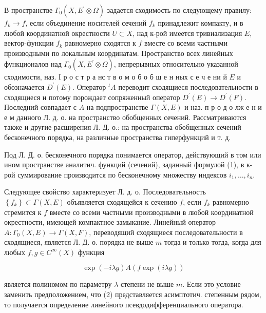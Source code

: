 \documentclass[10pt]{article}
\begin{document}
В пространстве $\Gamma_{0}\left(X, E^{\prime} \otimes \Omega\right)$ задается сходимость по следующему правилу: $f_{k} \rightarrow f$, если объединение носителей сечений $f_{k}$ принадлежит компакту, и в любой координатной окрестности $U \subset X$, над к-рой имеется тривиализация $E$, вектор-функции $f_{k}$ равномерно сходятся к $f$ вместе со всеми частными производными по локальным координатам. Пространство всех линейных функционалов над $\Gamma_{0}\left(X, E^{\prime} \otimes \Omega\right)$, непрерывных относительно указанной сходимости, наз. І р о с т р а нс т в о м о б о б щ е н ных с е ч е ни й $E$ и обозначается $D^{\prime}(E)$. Оператор ${ }^{t} A$ переводит сходящиеся последовательности в сходящиеся и потому порождает сопряженный оператор $D^{\prime}(E) \rightarrow D^{\prime}(F)$. Последний совпадает с $A$ на подпространстве $\Gamma(X, E)$ и наз. п р о д о лж е н и е м данного Л. д. о. на пространство обобщенных сечений. Рассматриваются также и другие расширения Л. Д. о.: на пространства обобщенных сечений бесконечного порядка, на различные пространства гиперфункций и т. д.



Под Л. Д. о. бесконечного порядка понимается оператор, действующий в том или ином пространстве аналитич. функций (сечений), заданный формулой (1), в к-рой суммирование производится по бесконечному множеству индексов $i_{1}, \ldots, i_{n}$.



Следующее свойство характеризует Л. д. о. Последовательность $\left\{f_{k}\right\} \subset \Gamma(X, E)$ объявляется сходящейся к сечению $f$, если $f_{k}$ равномерно стремится к $f$ вместе со всеми частными производными в любой координатной окрестности, имеющей компактное замыкание. Линейный оператор $A: \Gamma_{0}(X, E) \rightarrow \Gamma(X, F)$, переводящий сходящиеся последовательности в сходящиеся, является Л. Д. о. порядка не выше $m$ тогда и только тогда, когда для любых $f, g \in C^{\infty}(X)$ функция



\[

\exp (-i \lambda g) A(f \exp (i \lambda g))

\]



является полиномом по параметру $\lambda$ степени не выше $m$. Если это условие заменить предположением, что (2) представляется асимптотич. степенным рядом, то получается определение линейного псевдодифференциального оператора.
\end{document}
